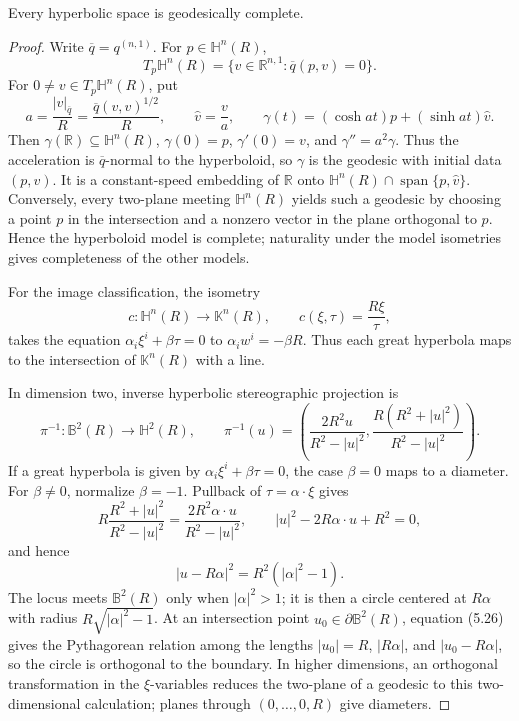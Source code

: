 \begin{theorem}
\label{thm:hyperbolic-geodesically-complete}
Every hyperbolic space is geodesically complete.

\begin{proof}
\sketch Write $\overline q=q^{(n,1)}$. For $p\in\mathbb H^n(R)$,
\[
T_p\mathbb H^n(R)=\{v\in\mathbb R^{n,1}:\overline q(p,v)=0\}.
\]
For $0\ne v\in T_p\mathbb H^n(R)$, put
\[
a=\frac{|v|_{\overline q}}R=\frac{\overline q(v,v)^{1/2}}R,
\qquad \widehat v=\frac va,
\qquad
\gamma(t)=(\cosh at)p+(\sinh at)\widehat v.
\]
Then $\gamma(\mathbb R)\subseteq\mathbb H^n(R)$,
$\gamma(0)=p$, $\gamma'(0)=v$, and $\gamma''=a^2\gamma$. Thus the acceleration
is $\overline q$-normal to the hyperboloid, so $\gamma$ is the geodesic with
initial data $(p,v)$. It is a constant-speed embedding of $\mathbb R$ onto
$\mathbb H^n(R)\cap\operatorname{span}\{p,\widehat v\}$. Conversely, every
two-plane meeting $\mathbb H^n(R)$ yields such a geodesic by choosing a point
$p$ in the intersection and a nonzero vector in the plane orthogonal to $p$.
Hence the hyperboloid model is complete; naturality under the model isometries
gives completeness of the other models.

For the image classification, the isometry
\[
c\colon\mathbb H^n(R)\longrightarrow\mathbb K^n(R),
\qquad c(\xi,\tau)=\frac{R\xi}{\tau},
\]
takes the equation $\alpha_i\xi^i+\beta\tau=0$ to
$\alpha_iw^i=-\beta R$. Thus each great hyperbola maps to the intersection of
$\mathbb K^n(R)$ with a line.

In dimension two, inverse hyperbolic stereographic projection is
\[
\pi^{-1}\colon\mathbb B^2(R)\longrightarrow\mathbb H^2(R),
\qquad
\pi^{-1}(u)=\left(
\frac{2R^2u}{R^2-|u|^2},
\frac{R(R^2+|u|^2)}{R^2-|u|^2}
\right).
\]
If a great hyperbola is given by $\alpha_i\xi^i+\beta\tau=0$, the case
$\beta=0$ maps to a diameter. For $\beta\ne0$, normalize $\beta=-1$. Pullback
of $\tau=\alpha\mathbin\cdot\xi$ gives
\[
R\frac{R^2+|u|^2}{R^2-|u|^2}
=\frac{2R^2\alpha\mathbin\cdot u}{R^2-|u|^2},
\qquad
|u|^2-2R\alpha\mathbin\cdot u+R^2=0,
\]
and hence
\begin{equation}
|u-R\alpha|^2=R^2(|\alpha|^2-1). \tag{5.26}
\end{equation}
The locus meets $\mathbb B^2(R)$ only when $|\alpha|^2>1$; it is then a
circle centered at $R\alpha$ with radius $R\sqrt{|\alpha|^2-1}$. At an
intersection point $u_0\in\partial\mathbb B^2(R)$, equation (5.26) gives the
Pythagorean relation among the lengths $|u_0|=R$, $|R\alpha|$, and
$|u_0-R\alpha|$, so the circle is orthogonal to the boundary. In higher
dimensions, an orthogonal transformation in the $\xi$-variables reduces the
two-plane of a geodesic to this two-dimensional calculation; planes through
$(0,\ldots,0,R)$ give diameters.


\end{proof}
\end{theorem}
